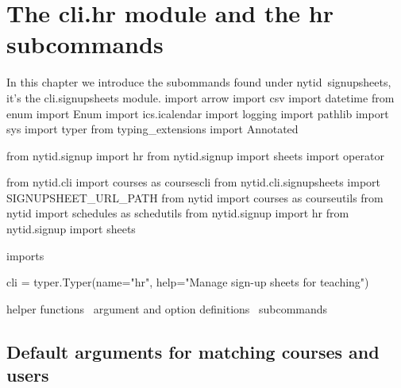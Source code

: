 \chapter{The {\Tt{}cli.hr\nwendquote} module and the {\Tt{}hr\nwendquote} subcommands}%
\label{cli.signupsheets}

In this chapter we introduce the subommands found under {\Tt{}nytid\ signupsheets\nwendquote},
it's the {\Tt{}cli.signupsheets\nwendquote} module.
\endmoddef\nwstartdeflinemarkup\nwenddeflinemarkup
import arrow
import csv
import datetime
from enum import Enum
import ics.icalendar
import logging
import pathlib
import sys
import typer
from typing_extensions import Annotated

from nytid.signup import hr
from nytid.signup import sheets
import operator

from nytid.cli import courses as coursescli
from nytid.cli.signupsheets import SIGNUPSHEET_URL_PATH
from nytid import courses as courseutils
from nytid import schedules as schedutils
from nytid.signup import hr
from nytid.signup import sheets

\LA{}imports~{\nwtagstyle{}}\RA{}

cli = typer.Typer(name="hr",
                  help="Manage sign-up sheets for teaching")

\LA{}helper functions~{\nwtagstyle{}}\RA{}
\LA{}argument and option definitions~{\nwtagstyle{}}\RA{}
\LA{}subcommands~{\nwtagstyle{}}\RA{}
\nwendcode{}\nwdocspar


\section{Default arguments for matching courses and users}

